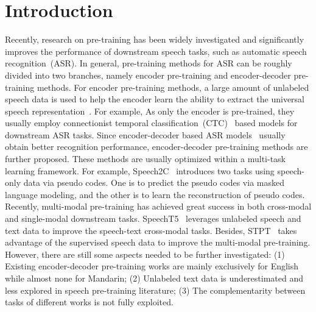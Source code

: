 \documentclass{article}
\begin{document}
\section{Introduction}
\label{sec:intro}
Recently, research on pre-training has been widely investigated and significantly improves the performance of downstream speech tasks, such as automatic speech recognition~(ASR). 
In general, pre-training methods for ASR can be roughly divided into two branches, namely encoder pre-training and encoder-decoder pre-training methods. For encoder pre-training methods, a large amount of unlabeled speech data is used to help the encoder learn the ability to extract the universal speech representation~\cite{schneider2019wav2vec,baevski2020wav2vec,hsu2021hubert,baevski2022data2vec}. 
For example,
As only the encoder is pre-trained, they usually employ connectionist temporal classification~(CTC)~\cite{graves2006connectionist} based models for downstream ASR tasks. 
Since encoder-decoder based ASR models~\cite{chan2015listen,mohamed2019transformers} usually obtain better recognition performance, encoder-decoder pre-training methods are further proposed.
These methods are usually optimized within a multi-task learning framework.
For example, Speech2C~\cite{ao2022pre} introduces two tasks using speech-only data via pseudo codes. One is to predict the pseudo codes via masked language modeling, and the other is to learn the reconstruction of pseudo codes. 
Recently, multi-modal pre-training has achieved great success in both cross-modal and single-modal downstream tasks.
SpeechT5~\cite{ao2021speecht5} leverages unlabeled speech and text data to improve the speech-text cross-modal tasks. Besides, STPT~\cite{tang2022unified} takes advantage of the supervised speech data to improve the multi-modal pre-training. However, there are still some aspects needed to be further investigated: (1) Existing encoder-decoder pre-training works are mainly exclusively for English while almost none for Mandarin; (2) Unlabeled text data is underestimated and less explored in speech pre-training literature; (3) The complementarity between tasks of different works is not fully exploited.
\end{document}
